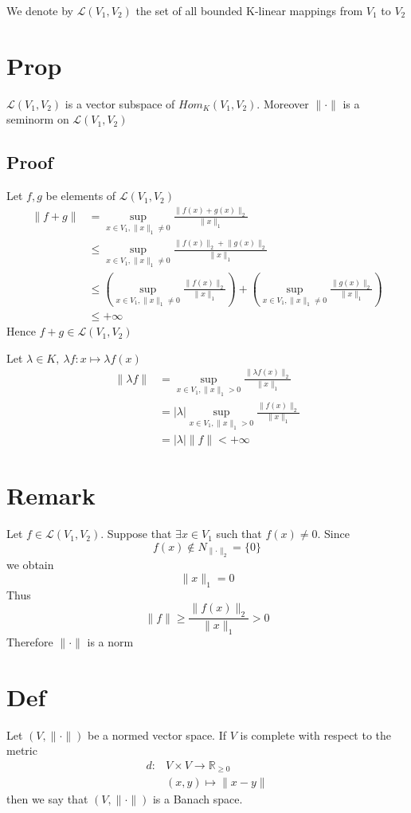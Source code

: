 \documentclass{book}
\begin{document}
We denote by $\mathscr{L}(V_1,V_2)$ the set of all bounded K-linear mappings from $V_1$ to $V_2$
\section{Prop}
$\mathscr{L}(V_1,V_2)$ is a vector subspace of $Hom_K(V_1,V_2)$. Moreover $\lVert\cdot\rVert$ is a seminorm on $\mathscr{L}(V_1,V_2)$
\subsection*{Proof}
Let $f,g$ be elements of $ \mathscr{L}(V_1,V_2)$
$$\begin{aligned}
    \lVert f+g\rVert&=\sup\limits_{x\in V_1,\lVert x\rVert _1\neq0}\frac{\lVert f(x)+g(x)\rVert _2}{\lVert x\rVert _1}\\
    &\leq\sup\limits_{x\in V_1,\lVert x\rVert _1\neq0}\frac{\lVert f(x)\rVert _2+\lVert g(x)\rVert _2}{\lVert x\rVert _1}\\
    &\leq(\sup\limits_{x\in V_1,\lVert x\rVert _1\neq0}\frac{\lVert f(x)\rVert _2}{\lVert x\rVert _1})+(\sup\limits_{x\in V_1,\lVert x\rVert _1\neq0}\frac{\lVert g(x)\rVert _2}{\lVert x\rVert _1})\\
    &\leq +\infty
\end{aligned}$$
Hence $f+g\in \mathscr{L}(V_1,V_2)$

Let $\lambda\in K,\ \lambda f:x\mapsto \lambda f(x)$
$$\begin{aligned}
    \lVert \lambda f\rVert &=\sup\limits_{x\in V_1,\lVert x\rVert _1>0} \frac{\lVert \lambda f(x)\rVert _2}{\lVert x\rVert _1}\\
    &=\lvert\lambda\rvert\sup\limits_{x\in V_1,\lVert x\rVert _1>0}\frac{\lVert f(x)\rVert _2}{\lVert x\rVert _1}\\
    &=\lvert\lambda\rvert\lVert f\rVert<+\infty
\end{aligned}$$
\section{Remark}
Let $f\in \mathscr{L}(V_1,V_2)$. Suppose that $\exists x\in V_1$ such that $f(x)\neq 0$. Since $$f(x)\not\in N_{\lVert\cdot\rVert _2}=\{0\}$$ we obtain $$\lVert x\rVert _1=0$$ Thus $$\lVert f\rVert\geq\frac{\lVert f(x)\rVert _2}{\lVert x\rVert _1}>0$$ Therefore $\lVert\cdot\rVert$ is a norm
\section{Def}Let $(V,\lVert \cdot\rVert)$ be a normed vector space. If $V$ is complete with respect to the metric$$\begin{aligned}
    d:&V\times V\rightarrow\mathbb{R}_{\geq0}\\
    &(x,y)\mapsto\lVert x-y\rVert
\end{aligned}$$
then we say that $(V,\lVert \cdot\rVert)$ is a Banach space.
\end{document}
